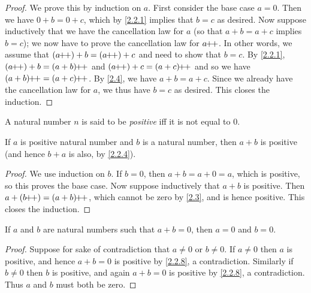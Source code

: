 \begin{proof}
  We prove this by induction on \(a\).
  First consider the base case \(a = 0\).
  Then we have \(0 + b = 0 + c\), which by \cref{2.2.1} implies that \(b = c\) as desired.
  Now suppose inductively that we have the cancellation law for \(a\) (so that \(a + b = a + c\) implies \(b = c\));
  we now have to prove the cancellation law for \(a\!\!+\!\!+\).
  In other words, we assume that \((a\pp) + b = (a\pp) + c\) and need to show that \(b = c\).
  By \cref{2.2.1}, \((a\pp) + b = (a + b)\pp\) and \((a\pp) + c = (a + c)\pp\) and so we have \((a + b)\pp = (a + c)\pp\).
  By \cref{2.4}, we have \(a + b = a + c\).
  Since we already have the cancellation law for \(a\), we thus have \(b = c\) as desired.
  This closes the induction.
\end{proof}

\begin{defn}\label{2.2.7}
  A natural number \(n\) is said to be \emph{positive} iff it is not equal to \(0\).
\end{defn}

\begin{prop}\label{2.2.8}
  If \(a\) is positive natural number and \(b\) is a natural number, then \(a + b\) is positive (and hence \(b + a\) is also, by \cref{2.2.4}).
\end{prop}

\begin{proof}
  We use induction on \(b\).
  If \(b = 0\), then \(a + b = a + 0 = a\), which is positive, so this proves the base case.
  Now suppose inductively that \(a + b\) is positive.
  Then \(a + (b\pp) = (a + b)\pp\), which cannot be zero by \cref{2.3}, and is hence positive.
  This closes the induction.
\end{proof}

\begin{cor}\label{2.2.9}
  If \(a\) and \(b\) are natural numbers such that \(a + b = 0\), then \(a = 0\) and \(b = 0\).
\end{cor}

\begin{proof}
  Suppose for sake of contradiction that \(a \neq 0\) or \(b \neq 0\).
  If \(a \neq 0\) then \(a\) is positive, and hence \(a + b = 0\) is positive by \cref{2.2.8}, a contradiction.
  Similarly if \(b \neq 0\) then \(b\) is positive, and again \(a + b = 0\) is positive by \cref{2.2.8}, a contradiction.
  Thus \(a\) and \(b\) must both be zero.
\end{proof}

